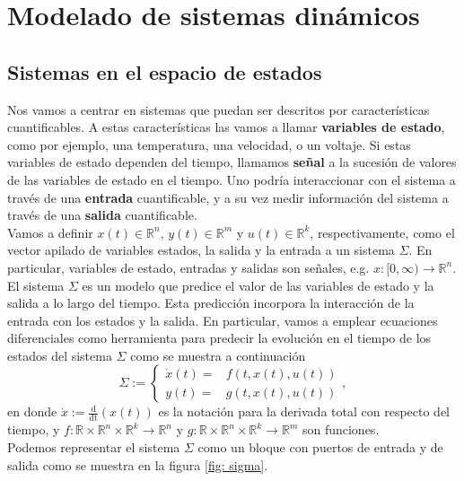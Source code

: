 \chapter{Modelado de sistemas dinámicos}\label{modelado}

\section{Sistemas en el espacio de estados}
Nos vamos a centrar en sistemas que puedan ser descritos por características cuantificables. A estas características las vamos a llamar {\bf variables de estado}, como por ejemplo, una temperatura, una velocidad, o un voltaje. Si estas variables de estado dependen del tiempo, llamamos {\bf señal} a la sucesión de valores de las variables de estado en el tiempo. Uno podría interaccionar con el sistema a través de una {\bf entrada} cuantificable, y a su vez medir información del sistema a través de una {\bf salida} cuantificable.\\

Vamos a definir $x(t)\in\mathbb{R}^n$, $y(t)\in\mathbb{R}^m$ y $u(t)\in\mathbb{R}^k$, respectivamente, como el vector apilado de variables estados, la salida y la entrada a un sistema $\Sigma$. En particular, variables de estado, entradas y salidas son señales, e.g. $x :[0,\infty) \to \mathbb{R}^n$.\\

El sistema $\Sigma$ es un modelo que predice el valor de las variables de estado y la salida a lo largo del tiempo. Esta predicción incorpora la interacción de la entrada con los estados y la salida. En particular, vamos a emplear ecuaciones diferenciales como herramienta para predecir la evolución en el tiempo de los estados del sistema $\Sigma$ como se muestra a continuación
\begin{equation}
	\Sigma := \begin{cases}
		\dot x(t) =& f(t,x(t),u(t)) \\ y(t) =& g(t,x(t),u(t))
	\end{cases}, 
\label{eq: sigma}
\end{equation}
en donde $\dot x := \frac{\mathrm{d}}{\mathrm{dt}}(x(t))$ es la notación para la derivada total con respecto del tiempo, y $f:\mathbb{R} \times \mathbb{R}^n \times \mathbb{R}^k \to \mathbb{R}^n$ y $g: \mathbb{R} \times \mathbb{R}^n \times \mathbb{R}^k \to \mathbb{R}^m$ son funciones.\\

Podemos representar el sistema $\Sigma$ como un bloque con puertos de entrada y de salida como se muestra en la figura \ref{fig: sigma}.\\

